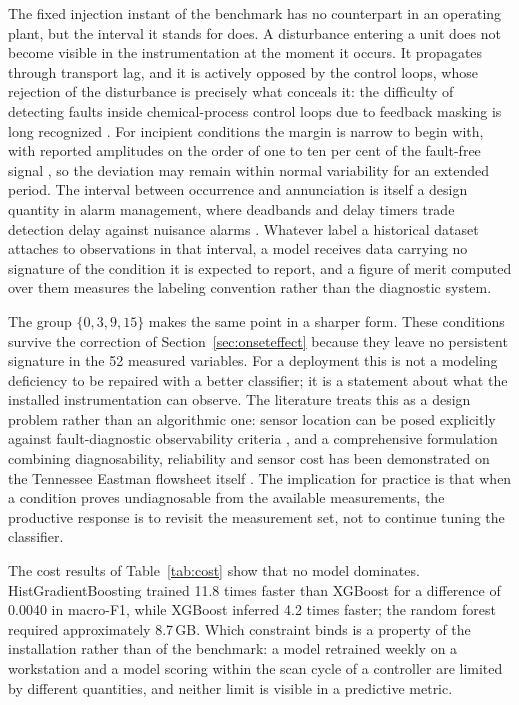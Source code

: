 \documentclass[10pt,twocolumn,a4paper]{article}
\begin{document}
The fixed injection instant of the benchmark has no counterpart in an operating
plant, but the interval it stands for does. A disturbance entering a unit does
not become visible in the instrumentation at the moment it occurs. It
propagates through transport lag, and it is actively opposed by the control
loops, whose rejection of the disturbance is precisely what conceals it: the
difficulty of detecting faults inside chemical-process control loops due to
feedback masking is long recognized \cite{park2020review}. For incipient
conditions the margin is narrow to begin with, with reported amplitudes on the
order of one to ten per cent of the fault-free signal
\cite{safaeipour2021incipient}, so the deviation may remain within normal
variability for an extended period. The interval between occurrence and
annunciation is itself a design quantity in alarm management, where deadbands
and delay timers trade detection delay against nuisance alarms
\cite{adnan2011delays}. Whatever label a historical dataset attaches to
observations in that interval, a model receives data carrying no signature of
the condition it is expected to report, and a figure of merit computed over
them measures the labeling convention rather than the diagnostic system.

The group $\{0,3,9,15\}$ makes the same point in a sharper form. These
conditions survive the correction of Section~\ref{sec:onseteffect} because they
leave no persistent signature in the 52 measured variables. For a deployment
this is not a modeling deficiency to be repaired with a better classifier; it
is a statement about what the installed instrumentation can observe. The
literature treats this as a design problem rather than an algorithmic one:
sensor location can be posed explicitly against fault-diagnostic observability
criteria \cite{raghuraj1999sensors}, and a comprehensive formulation combining
diagnosability, reliability and sensor cost has been demonstrated on the
Tennessee Eastman flowsheet itself \cite{bhushan2002sensor}. The implication
for practice is that when a condition proves undiagnosable from the available
measurements, the productive response is to revisit the measurement set, not to
continue tuning the classifier.

The cost results of Table~\ref{tab:cost} show that no model dominates.
HistGradientBoosting trained 11.8 times faster than XGBoost for a difference of
0.0040 in macro-F1, while XGBoost inferred 4.2 times faster; the random forest
required approximately 8.7\,GB. Which constraint binds is a property of the
installation rather than of the benchmark: a model retrained weekly on a
workstation and a model scoring within the scan cycle of a controller are
limited by different quantities, and neither limit is visible in a predictive
metric.
\end{document}
